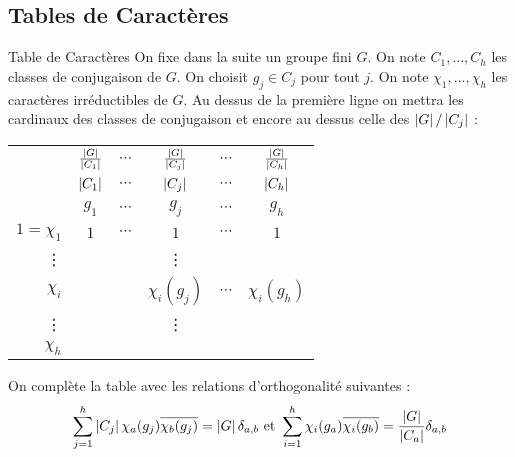 \documentclass{cours}
\begin{document}
\subsection{Tables de Caractères}
\begin{définition}{Table de Caractères}{}
    On fixe dans la suite un groupe fini $G$. On note $C_{1}, \ldots, C_{h}$ les classes de conjugaison de $G$. On choisit $g_{j} \in C_{j}$ pour tout $j$. On note $\chi_{1}, \ldots, \chi_{h}$ les caractères irréductibles de $G$. Au dessus de la première ligne on mettra les cardinaux des classes de conjugaison et encore au dessus celle des $\left|G\right|/\left|C_{j}\right|$ :
    \begin{center}
        \begin{tabular}{r|ccccc}
                           & $\frac{\left|G\right|}{\left|C_{1}\right|}$ & $\cdots$ & $\frac{\left|G\right|}{\left|C_{j}\right|}$ & $\cdots$ & $\frac{\left|G\right|}{\left|C_{h}\right|}$ \\
                           & $\left|C_{1}\right|$                 & $\cdots$ & $\left|C_{j}\right|$                 & $\cdots$ & $\left|C_{h}\right|$                 \\
                           & $g_{1}$                       & $\cdots$ & $g_{j}$                       & $\cdots$ & $g_{h}$                       \\
            \midrule
            $1 = \chi_{1}$ & $1$                           & $\cdots$ & $1$                           & $\cdots$ & $1$                           \\
            \vdots         &                               &          & \vdots                        &          &                               \\
            $\chi_{i}$     &                               &          & $\chi_{i}(g_{j})$             & $\cdots$ & $\chi_{i}(g_{h})$             \\
            \vdots         &                               &          & \vdots                        &          &                               \\
            $\chi_{h}$     &                               &          &                               &          &
        \end{tabular}
    \end{center}
    On complète la table avec les relations d'orthogonalité suivantes :
    \[
        \sum_{j = 1}^{h}\left|C_{j}\right|\chi_{a}(g_{j})\overline{\chi_{b}(g_{j})} = \left|G\right|\delta_{a, b} \text{ et } \sum_{i = 1}^{h}\chi_{i}(g_{a})\overline{\chi_{i}(g_{b})} = \frac{\left|G\right|}{\left|C_{a}\right|}\delta_{a, b}
    \]
\end{définition}
\end{document}
